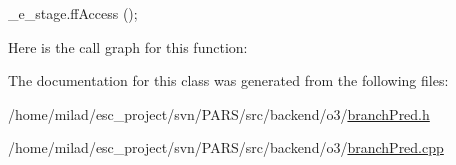 \begin{DoxyCode}
                            {
    _e_stage.ffAccess ();
}
\end{DoxyCode}


Here is the call graph for this function:




The documentation for this class was generated from the following files:\begin{DoxyCompactItemize}
\item 
/home/milad/esc\_\-project/svn/PARS/src/backend/o3/\hyperlink{o3_2branchPred_8h}{branchPred.h}\item 
/home/milad/esc\_\-project/svn/PARS/src/backend/o3/\hyperlink{o3_2branchPred_8cpp}{branchPred.cpp}\end{DoxyCompactItemize}
